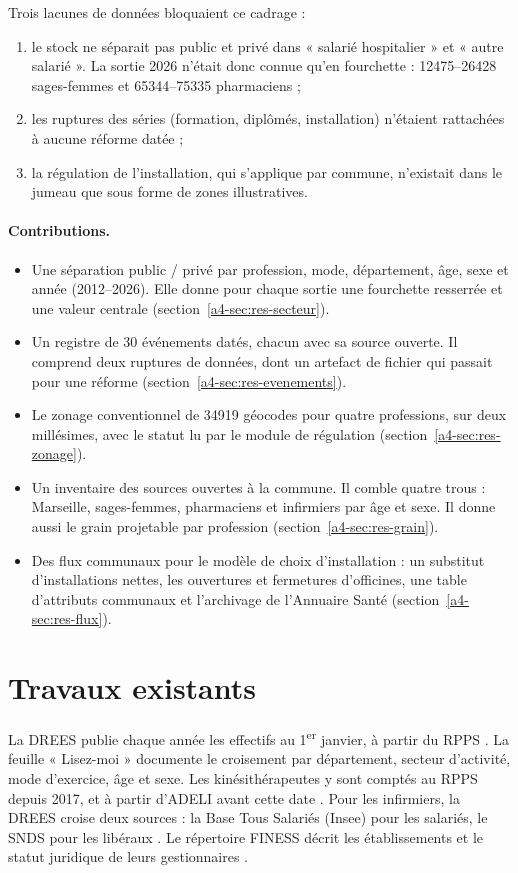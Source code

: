 Trois lacunes de données bloquaient ce cadrage :
\begin{enumerate}
  \item le stock ne séparait pas public et privé dans « salarié hospitalier » et « autre salarié ». La sortie
  2026 n'était donc connue qu'en fourchette : \num{12475}--\num{26428} sages-femmes et
  \num{65344}--\num{75335} pharmaciens\mesure{} ;
  \item les ruptures des séries (formation, diplômés, installation) n'étaient rattachées à aucune réforme datée ;
  \item la régulation de l'installation, qui s'applique par commune, n'existait dans le jumeau que sous forme de
  zones illustratives.
\end{enumerate}

\paragraph{Contributions.}
\begin{itemize}
  \item Une séparation public / privé par profession, mode, département, âge, sexe et année (2012--2026). Elle
  donne pour chaque sortie une fourchette resserrée et une valeur centrale (section~\ref{a4-sec:res-secteur}).
  \item Un registre de 30 événements datés, chacun avec sa source ouverte. Il comprend deux ruptures de données,
  dont un artefact de fichier qui passait pour une réforme (section~\ref{a4-sec:res-evenements}).
  \item Le zonage conventionnel de \num{34919} géocodes pour quatre professions, sur deux millésimes, avec le
  statut lu par le module de régulation (section~\ref{a4-sec:res-zonage}).
  \item Un inventaire des sources ouvertes à la commune. Il comble quatre trous : Marseille, sages-femmes,
  pharmaciens et infirmiers par âge et sexe. Il donne aussi le grain projetable par profession
  (section~\ref{a4-sec:res-grain}).
  \item Des flux communaux pour le modèle de choix d'installation : un substitut d'installations nettes, les
  ouvertures et fermetures d'officines, une table d'attributs communaux et l'archivage de l'Annuaire Santé
  (section~\ref{a4-sec:res-flux}).
\end{itemize}

\section{Travaux existants}
La DREES publie chaque année les effectifs au 1\textsuperscript{er} janvier, à partir du RPPS
\citep{a4-drees2026demo}. La feuille « Lisez-moi » documente le croisement par département, secteur d'activité,
mode d'exercice, âge et sexe. Les kinésithérapeutes y sont comptés au RPPS depuis 2017, et à partir d'ADELI
avant cette date \citep{a4-drees2020er1159}. Pour les infirmiers, la DREES croise deux sources : la Base Tous Salariés
(Insee) pour les salariés, le SNDS pour les libéraux \citep{a4-dreesbts2026}. Le répertoire FINESS décrit les
établissements et le statut juridique de leurs gestionnaires \citep{a4-finessEt2026,a4-finessEj2026}.


